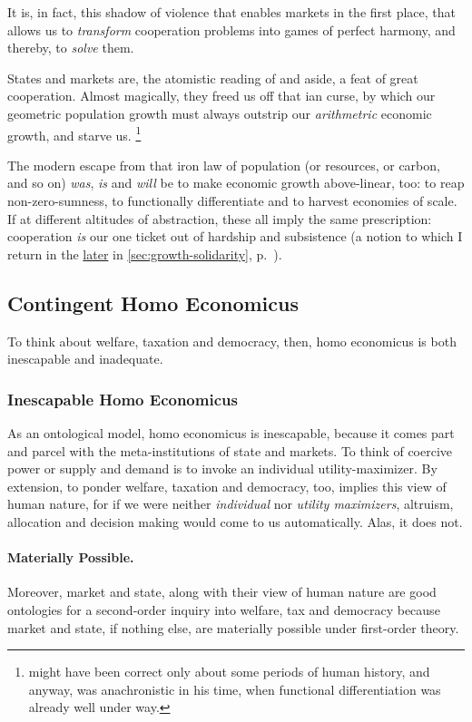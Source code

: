 It is, in fact, this shadow of violence that enables markets in the first place, that allows us to \emph{transform} cooperation problems into games of perfect harmony, and thereby, to \emph{solve} them.

States and markets are, the atomistic reading of \citeauthor{Hobbes-1651-aa} and \citeauthor{Smith-1776-lq} aside, a feat of great cooperation.
Almost magically, they freed us off that \citeauthor{Malthus1798}ian curse, by which our geometric population growth must always outstrip our \emph{arithmetric} economic growth, and starve us.
\footnote{
	\cite{Malthus1798} might have been correct only about some periods of human history, and anyway, was anachronistic in his time, when functional differentiation was already well under way.
}

The modern escape from that iron law of population (or resources, or carbon, and so on) \emph{was}, \emph{is} and \emph{will} be to make economic growth above-linear, too:
to reap non-zero-sumness, to functionally differentiate and to harvest economies of scale.
If at different altitudes of abstraction, these all imply the same prescription:
cooperation \emph{is} our one ticket out of hardship and subsistence (a notion to which I return in the \hyperref[sec:growth-solidarity]{later} in \autoref{sec:growth-solidarity}, p.~\pageref{sec:growth-solidarity}).

\subsection{Contingent Homo Economicus}
	\label{sec:contingent-homo-economicus}
To think about welfare, taxation and democracy, then, homo economicus is both inescapable and inadequate.

\subsubsection{Inescapable Homo Economicus}
As an ontological model, homo economicus is inescapable, because it comes part and parcel with the meta-institutions of state and markets.
To think of coercive power or supply and demand is to invoke an individual utility-maximizer.
By extension, to ponder welfare, taxation and democracy, too, implies this view of human nature, for if we were neither \emph{individual} nor \emph{utility maximizers}, altruism, allocation and decision making would come to us automatically.
Alas, it does not.

\paragraph{Materially Possible.}
Moreover, market and state, along with their view of human nature are good ontologies for a second-order inquiry into welfare, tax and democracy because market and state, if nothing else, are materially possible under first-order theory.

